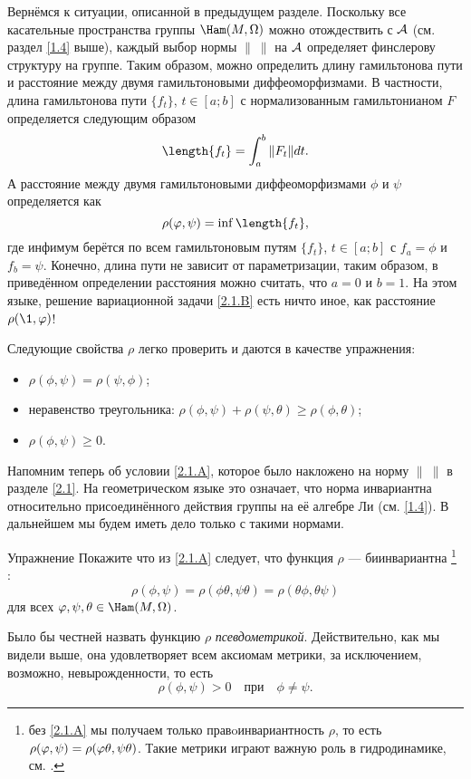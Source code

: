 Вернёмся к ситуации, описанной в предыдущем разделе.
Поскольку все касательные пространства группы $\Ham(M, \Omega)$ можно отождествить с $\mathcal{A}$ (см. раздел \ref{1.4} выше), каждый выбор нормы $\|\ \|$ на $\mathcal{A}$ определяет финслерову структуру на группе.
Таким образом, можно определить длину гамильтонова пути и расстояние между двумя гамильтоновыми диффеоморфизмами.
В частности, длина гамильтонова пути $\{f_t\}$, $t \in [a; b]$ с нормализованным гамильтонианом $F$ определяется следующим образом 
\[\length\{f_t\}=\int_a^b \| F_t \| dt.\]
А расстояние между двумя гамильтоновыми диффеоморфизмами $\phi$ и $\psi$ определяется как
\[\rho (\phi, \psi) = \inf \length \{f_t\},\] 
где инфимум берётся по всем гамильтоновым путям $\{f_t\}$, $t \in [a; b]$ с $f_a = \phi$ и $f_b = \psi$.
Конечно, длина пути не зависит от параметризации, таким образом, в приведённом определении расстояния можно считать, что $a = 0$ и $b = 1$.
На этом языке, решение вариационной задачи
\ref{2.1.B} есть ничто иное, как расстояние $\rho (\1, \phi)$!

Следующие свойства $\rho$ легко проверить и даются в качестве упражнения:
\begin{itemize}
\item $\rho (\phi, \psi) = \rho (\psi, \phi)$;
\item неравенство треугольника: $\rho (\phi, \psi) + \rho (\psi, \theta) \ge \rho (\phi, \theta)$;
\item $\rho (\phi, \psi) \ge 0$.
\end{itemize}

Напомним теперь об условии \ref{2.1.A}, которое было накложено на норму $\|\ \|$ в разделе \ref{2.1}.
На геометрическом языке это означает, что норма инвариантна относительно присоединённого действия группы на её алгебре Ли (см. \ref{1.4}).
В дальнейшем мы будем иметь дело только с такими нормами.

\begin{thm*}{Упражнение}
Покажите что из \ref{2.1.A} следует, что функция $\rho$ --- биинвариантна%
\footnote{без \ref{2.1.A} мы получаем только правoинвариантность $\rho$, то есть $\rho (\phi, \psi) \z= \rho (\phi\theta, \psi\theta)$.
Такие метрики играют важную роль в гидродинамике, см. \cite{AK}.}%
:
\[\rho (\phi, \psi) = \rho (\phi \theta, \psi \theta) = \rho (\theta\phi, \theta\psi)\]
для всех $\phi, \psi, \theta \in \Ham (M, \Omega)$.
\end{thm*}

Было бы честней назвать функцию $\rho$ \emph{псевдометрикой}.
Действительно, как мы видели выше, она удовлетворяет всем аксиомам метрики, за исключением, возможно, невырожденности, то есть 
\begin{equation}
\rho (\phi, \psi)> 0
\quad\text{при}\quad
\phi \ne \psi.
\label{eq:2.2.A}
\end{equation}

